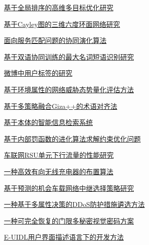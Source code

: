 \documentclass[a4paper]{article}
\begin{document}
\href{http://www.jos.org.cn/ch/reader/download_pdf.aspx?file_no=4612&year_id=2015&quarter_id=7&falg=1}{基于全局排序的高维多目标优化研究}

\href{http://www.jos.org.cn/ch/reader/download_pdf.aspx?file_no=4588&year_id=2015&quarter_id=7&falg=1}{基于Cayley图的三维六度环面网络研究}

\href{http://www.jos.org.cn/ch/reader/download_pdf.aspx?file_no=4698&year_id=2015&quarter_id=7&falg=1}{面向服务匹配问题的协同演化算法}

\href{http://www.jos.org.cn/ch/reader/download_pdf.aspx?file_no=4630&year_id=2015&quarter_id=7&falg=1}{基于双语协同训练的最大名词短语识别研究}

\href{http://www.jos.org.cn/ch/reader/download_pdf.aspx?file_no=4655&year_id=2015&quarter_id=7&falg=1}{微博中用户标签的研究}

\href{http://www.jos.org.cn/ch/reader/download_pdf.aspx?file_no=4624&year_id=2015&quarter_id=7&falg=1}{基于环境属性的网络威胁态势量化评估方法}

\href{http://www.jos.org.cn/ch/reader/download_pdf.aspx?file_no=4615&year_id=2015&quarter_id=7&falg=1}{基于多策略融合Giza++的术语对齐法}

\href{http://www.jos.org.cn/ch/reader/download_pdf.aspx?file_no=4622&year_id=2015&quarter_id=7&falg=1}{基于本体的智能信息检索系统}

\href{http://www.jos.org.cn/ch/reader/download_pdf.aspx?file_no=4623&year_id=2015&quarter_id=7&falg=1}{基于内部罚函数的进化算法求解约束优化问题}

\href{http://www.jos.org.cn/ch/reader/download_pdf.aspx?file_no=4616&year_id=2015&quarter_id=7&falg=1}{车联网RSU单元下行流量的性能研究}

\href{http://www.jos.org.cn/ch/reader/download_pdf.aspx?file_no=4618&year_id=2015&quarter_id=7&falg=1}{一种高效有向无线充电器的布置算法}

\href{http://www.jos.org.cn/ch/reader/download_pdf.aspx?file_no=4629&year_id=2015&quarter_id=7&falg=1}{基于预测的机会车载网络中继选择策略研究}

\href{http://www.jos.org.cn/ch/reader/download_pdf.aspx?file_no=4673&year_id=2015&quarter_id=7&falg=1}{一种基于多属性决策的DDoS防护措施遴选方法}

\href{http://www.jos.org.cn/ch/reader/download_pdf.aspx?file_no=4611&year_id=2015&quarter_id=7&falg=1}{一种可完全恢复的门限多秘密视觉密码方案}

\href{http://www.jos.org.cn/ch/reader/download_pdf.aspx?file_no=4584&year_id=2015&quarter_id=7&falg=1}{E-UIDL用户界面描述语言下的开发方法}
\end{document}
